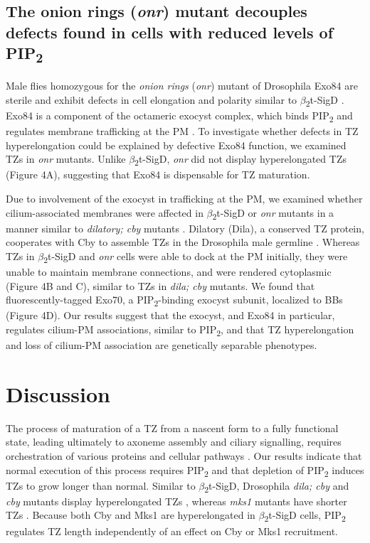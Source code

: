 \documentclass[12pt, twoside, letterpaper]{article}
\newcommand{\PIP}{PIP\textsubscript{2}}
\newcommand{\sigd}{$\beta$\textsubscript{2}t-SigD}
\begin{document}
\begin{doublespacing}
\begin{linenumbers}
    \subsection*{The onion rings (\textit{onr}) mutant decouples defects found in cells with reduced levels of \PIP{}}
    Male flies homozygous for the \textit{onion rings}
    (\textit{onr}) mutant of Drosophila Exo84 are sterile and exhibit defects
    in cell elongation and polarity
    similar to \sigd{} \citep{wei2008depletion}.
    Exo84 is a component of the octameric exocyst complex, which binds
    \PIP{} and regulates membrane trafficking at the PM 
    \citep{he2007exo70}.
    To investigate whether defects in TZ hyperelongation could be explained by
    defective Exo84 function, we examined TZs in \textit{onr} mutants.
    Unlike \sigd{}, \textit{onr} did not display hyperelongated TZs (Figure 4A),
    suggesting that Exo84 is dispensable for TZ maturation.

    Due to involvement of the exocyst in trafficking at the PM,
    we examined whether cilium-associated membranes were affected in \sigd{}
    or \textit{onr} mutants in a manner similar to \textit{dilatory; cby} mutants
    \citep{vieillard2016transition}. 
    Dilatory (Dila), a conserved TZ protein, cooperates with Cby to assemble TZs in
    the Drosophila male germline \citep{vieillard2016transition}.
    Whereas TZs in \sigd{} and \textit{onr} cells were able to dock
    at the PM initially, they were unable to maintain
    membrane connections, and were rendered cytoplasmic (Figure 4B and C), similar to TZs in
    \textit{dila; cby} mutants.
    We found that fluorescently-tagged Exo70, a \PIP{}-binding exocyst subunit,
    localized to BBs (Figure 4D).
    Our results suggest that the exocyst, and Exo84 in particular, regulates
    cilium-PM associations, similar to \PIP{}, and that TZ hyperelongation and loss of
    cilium-PM association are genetically separable phenotypes.

    \section*{Discussion}
    The process of maturation of a TZ from a nascent form to a fully functional state,
    leading ultimately to axoneme assembly and ciliary signalling,
    requires orchestration of various proteins and cellular pathways
    \citep{reiter2012base, gonccalves2017ciliary}.
    Our results indicate that normal execution of this process
    requires \PIP{} and that depletion of \PIP{} induces TZs to
    grow longer than normal.
    Similar to \sigd{}, Drosophila \textit{dila; cby} and \textit{cby}
    mutants display hyperelongated TZs
    \citep{enjolras2012drosophila,vieillard2016transition},
    whereas \textit{mks1} mutants have shorter TZs \citep{pratt2016drosophila}.
    Because both Cby and Mks1 are hyperelongated in \sigd{} cells,
    \PIP{} regulates TZ length independently of an effect on Cby or Mks1 recruitment.


\end{linenumbers}
\end{doublespacing}
\end{document}
